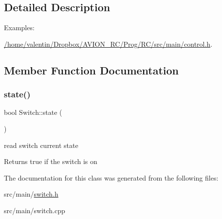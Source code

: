 \subsection{Detailed Description}
\begin{Desc}
\item[Examples\+: ]\par
\hyperlink{_2home_2valentin_2_dropbox_2_a_v_i_o_n__r_c_2_prog_2_r_c_2src_2main_2control_8h-example}{/home/valentin/\+Dropbox/\+A\+V\+I\+O\+N\+\_\+\+R\+C/\+Prog/\+R\+C/src/main/control.\+h}.\end{Desc}


\subsection{Member Function Documentation}
\mbox{\label{class_switch_ac9b4369bd630f9d975f2bd82933f7cc6}} 
\subsubsection{\texorpdfstring{state()}{state()}}
{\footnotesize\ttfamily bool Switch\+::state (\begin{DoxyParamCaption}{ }\end{DoxyParamCaption})}



read switch current state 

\begin{DoxyReturn}{Returns}
true if the switch is on 
\end{DoxyReturn}


The documentation for this class was generated from the following files\+:\begin{DoxyCompactItemize}
\item 
src/main/\hyperlink{switch_8h}{switch.\+h}\item 
src/main/switch.\+cpp\end{DoxyCompactItemize}

